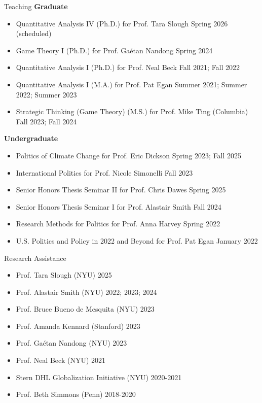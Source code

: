 \documentclass{resume} %
\begin{document}
\begin{rSection}{Teaching}
\textbf{Graduate}
\begin{itemize}
\item Quantitative Analysis IV (Ph.D.) for Prof. Tara Slough \hfill Spring 2026 (scheduled)
\item Game Theory I (Ph.D.) for Prof. Ga\'etan Nandong \hfill Spring 2024
\item Quantitative Analysis I (Ph.D.) for Prof. Neal Beck \hfill Fall 2021; Fall 2022
\item Quantitative Analysis I (M.A.) for Prof. Pat Egan \hfill Summer 2021; Summer 2022; Summer 2023
\item Strategic Thinking (Game Theory) (M.S.) for Prof. Mike Ting (Columbia) \hfill Fall 2023; Fall 2024
\end{itemize}
\textbf{Undergraduate}
\begin{itemize}
\item Politics of Climate Change  for Prof. Eric Dickson \hfill Spring 2023; Fall 2025
\item International Politics  for Prof. Nicole Simonelli \hfill Fall 2023
\item Senior Honors Thesis Seminar II  for Prof. Chris Dawes \hfill Spring 2025
\item Senior Honors Thesis Seminar I  for Prof. Alastair Smith \hfill Fall 2024
\item Research Methods for Politics  for Prof. Anna Harvey \hfill Spring 2022
\item U.S. Politics and Policy in 2022 and Beyond  for Prof. Pat Egan \hfill January 2022
\end{itemize}
\end{rSection}

\begin{rSection}{Research Assistance}
\begin{itemize}
\item Prof. Tara Slough (NYU) \hfill 2025
    \item Prof. Alastair Smith (NYU) \hfill 2022; 2023; 2024
    \item Prof. Bruce Bueno de Mesquita (NYU) \hfill 2023
   \item  Prof. Amanda Kennard (Stanford) \hfill 2023
    \item Prof. Ga\'etan Nandong (NYU) \hfill 2023
    \item Prof. Neal Beck (NYU) \hfill 2021
   \item  Stern DHL Globalization Initiative (NYU) \hfill 2020-2021
   \item  Prof. Beth Simmons (Penn) \hfill 2018-2020
    \end{itemize}
\end{rSection}
\end{document}
